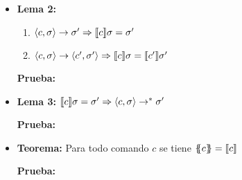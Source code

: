 \begin{itemize}
\begin{enumerate}
        \item
        \item
      \end{enumerate}

      \item \textbf{Lema 2:}
        \begin{enumerate}
          \item $\langle c, \sigma\rangle \rightarrow \sigma' \Rightarrow \llbracket c\rrbracket \sigma = \sigma'$
          \item $\langle c, \sigma\rangle \rightarrow \langle c', \sigma'\rangle \Rightarrow \llbracket c\rrbracket \sigma = \llbracket c'\rrbracket\sigma'$
        \end{enumerate}

        \PN \textbf{Prueba:}

      \item \textbf{Lema 3:} $\llbracket c\rrbracket \sigma = \sigma' \Rightarrow \langle c, \sigma\rangle \rightarrow^{\ast} \sigma'$
        
        \PN \textbf{Prueba:}

      \item \textbf{Teorema:} Para todo comando $c$ se tiene $\{\!\!\{c\}\!\!\} = \llbracket c\rrbracket$
        
        \PN \textbf{Prueba:}

    \end{itemize}